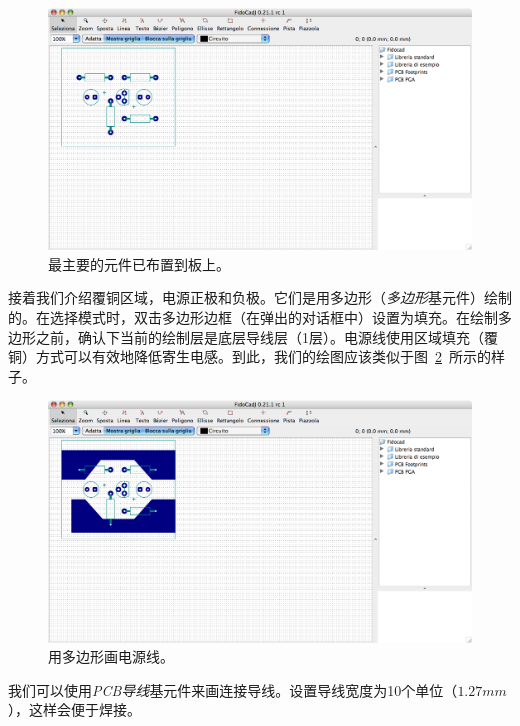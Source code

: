 \documentclass[10pt,a4paper,twoside]{scrreprt}
\begin{document}
\begin{figure}
\includegraphics[width=1\textwidth]{amplificateur_phase1} 
\caption{最主要的元件已布置到板上。}
\label{fig_amplificateur_phase1} 
\end{figure}

接着我们介绍覆铜区域，电源正极和负极。它们是用多边形（\emph{多边形}基元件）绘制的。在选择模式时，双击多边形边框（在弹出的对话框中）设置为填充。在绘制多边形之前，确认下当前的绘制层是底层导线层（1层）。电源线使用区域填充（覆铜）方式可以有效地降低寄生电感。到此，我们的绘图应该类似于图~\ref{fig_amplificateur_phase2}~所示的样子。

\begin{figure}
\includegraphics[width=1\textwidth]{amplificateur_phase2} 
\caption{用多边形画电源线。}
\label{fig_amplificateur_phase2} 
\end{figure}

我们可以使用\emph{PCB导线}基元件来画连接导线。设置导线宽度为10个单位（$1.27mm$），这样会便于焊接。 
\end{document}
